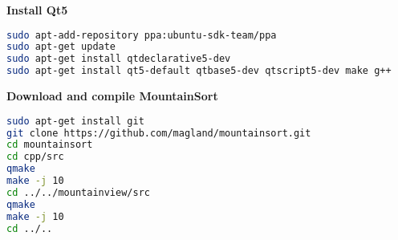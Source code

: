 \documentclass[hidelinks,10pt]{article}
\begin{document}
\noindent
\textbf{Install Qt5}

{\color{color1}
\begin{lstlisting}[language=bash]
sudo apt-add-repository ppa:ubuntu-sdk-team/ppa
sudo apt-get update
sudo apt-get install qtdeclarative5-dev
sudo apt-get install qt5-default qtbase5-dev qtscript5-dev make g++
\end{lstlisting}}

\noindent
\textbf{Download and compile MountainSort}
{\color{color1}
\begin{lstlisting}[language=bash]
sudo apt-get install git
git clone https://github.com/magland/mountainsort.git
cd mountainsort
cd cpp/src
qmake
make -j 10
cd ../../mountainview/src
qmake
make -j 10
cd ../..
\end{lstlisting}}







\end{document}
